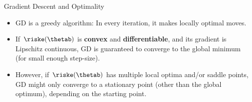 
\begin{vbframe}{Gradient Descent and Optimality}

\begin{minipage}{0.45\textwidth}
    \begin{small}
    \begin{itemize}
      \item GD is a greedy algorithm: In every iteration, it makes locally optimal moves.
      \vspace*{2mm}
      \item If $\riske(\thetab)$ is \textbf{convex} and \textbf{differentiable}, and its gradient is Lipschitz continuous, GD is guaranteed to converge to the global minimum (for small enough step-size).  
      \vspace*{2mm}
    \item However, if $\riske(\thetab)$ has multiple local optima and/or saddle points, GD might only converge to a stationary point (other than the global optimum), depending on the starting point. 
    \end{itemize}
    \end{small}
  \end{minipage}\hfill
  \begin{minipage}{0.5\textwidth}
    \begin{figure}
      \centering

\end{figure}
\end{minipage}
\end{vbframe}
